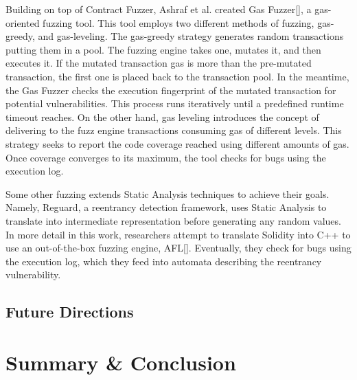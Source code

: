 \documentclass[a4paper,11pt]{article}
\begin{document}
Building on top of Contract Fuzzer, Ashraf et al. created Gas Fuzzer[], a
gas-oriented fuzzing tool. This tool employs two different methods of fuzzing,
gas-greedy, and gas-leveling. The gas-greedy strategy generates random
transactions putting them in a pool. The fuzzing engine takes one, mutates it,
and then executes it. If the mutated transaction gas is more than the
pre-mutated transaction, the first one is placed back to the transaction pool.
In the meantime, the Gas Fuzzer checks the execution fingerprint of the mutated
transaction for potential vulnerabilities. This process runs iteratively until a
predefined runtime timeout reaches. On the other hand, gas leveling introduces
the concept of delivering to the fuzz engine transactions consuming gas of
different levels. This strategy seeks to report the code coverage reached using
different amounts of gas. Once coverage converges to its maximum, the tool
checks for bugs using the execution log. 

Some other fuzzing extends Static Analysis techniques to achieve their goals.
Namely, Reguard, a reentrancy detection framework, uses Static Analysis to
translate into intermediate representation before generating any random values.
In more detail in this work, researchers attempt to translate Solidity into C++
to use an out-of-the-box fuzzing engine, AFL[]. Eventually, they check for bugs
using the execution log, which they feed into automata describing the reentrancy
vulnerability.

\subsection{Future Directions}

\section{Summary \& Conclusion}

\nocite{*}



\small

\end{document}
